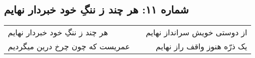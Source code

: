 \begin{center}
\section*{شماره ۱۱: هر چند ز ننگِ خود خبردار نهایم }
\label{sec:011}
\begin{longtable}{l p{0.5cm} r}
هر چند ز ننگِ خود خبردار نهایم 
&&
از دوستی خویش سرانداز نهایم
\\
عمریست که چون چرخ درین میگردیم
&&
یک ذرّه هنوز واقف راز نهایم
\\
\end{longtable}
\end{center}
